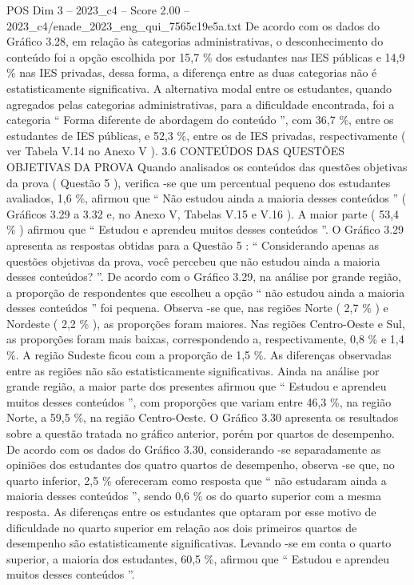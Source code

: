 \begin{textsample}{POS Dim 3 – 2023\_c4 – Score 2.00 – 2023\_c4/enade\_2023\_eng\_qui\_7565c19e5a.txt}
De acordo com os dados do Gráfico 3.28, em relação às categorias administrativas, o desconhecimento do conteúdo foi a opção escolhida por 15,7 \% dos estudantes nas IES públicas e 14,9 \% nas IES privadas, dessa forma, a diferença entre as duas categorias não é estatisticamente significativa.
A alternativa modal entre os estudantes, quando agregados pelas categorias administrativas, para a dificuldade encontrada, foi a categoria “ Forma diferente de abordagem do conteúdo ”, com 36,7 \%, entre os estudantes de IES públicas, e 52,3 \%, entre os de IES privadas, respectivamente ( ver Tabela V.14 no Anexo V ). 3.6 CONTEÚDOS DAS QUESTÕES OBJETIVAS DA PROVA Quando analisados os conteúdos das questões objetivas da prova ( Questão 5 ), verifica -se que um percentual pequeno dos estudantes avaliados, 1,6 \%, afirmou que “ Não estudou ainda a maioria desses conteúdos ” ( Gráficos 3.29 a 3.32 e, no Anexo V, Tabelas V.15 e V.16 ).
A maior parte ( 53,4 \% ) afirmou que “ Estudou e aprendeu muitos desses conteúdos ”.
O Gráfico 3.29 apresenta as respostas obtidas para a Questão 5 : “ Considerando apenas as questões objetivas da prova, você percebeu que não estudou ainda a maioria desses conteúdos? ”.
De acordo com o Gráfico 3.29, na análise por grande região, a proporção de respondentes que escolheu a opção “ não estudou ainda a maioria desses conteúdos ” foi pequena.
Observa -se que, nas regiões Norte ( 2,7 \% ) e Nordeste ( 2,2 \% ), as proporções foram maiores.
Nas regiões Centro-Oeste e Sul, as proporções foram mais baixas, correspondendo a, respectivamente, 0,8 \% e 1,4 \%.
A região Sudeste ficou com a proporção de 1,5 \%.
As diferenças observadas entre as regiões não são estatisticamente significativas.
Ainda na análise por grande região, a maior parte dos presentes afirmou que “ Estudou e aprendeu muitos desses conteúdos ”, com proporções que variam entre 46,3 \%, na região Norte, a 59,5 \%, na região Centro-Oeste.
O Gráfico 3.30 apresenta os resultados sobre a questão tratada no gráfico anterior, porém por quartos de desempenho.
De acordo com os dados do Gráfico 3.30, considerando -se separadamente as opiniões dos estudantes dos quatro quartos de desempenho, observa -se que, no quarto inferior, 2,5 \% ofereceram como resposta que “ não estudaram ainda a maioria desses conteúdos ”, sendo 0,6 \% os do quarto superior com a mesma resposta.
As diferenças entre os estudantes que optaram por esse motivo de dificuldade no quarto superior em relação aos dois primeiros quartos de desempenho são estatisticamente significativas.
Levando -se em conta o quarto superior, a maioria dos estudantes, 60,5 \%, afirmou que “ Estudou e aprendeu muitos desses conteúdos ”.

\end{textsample}
